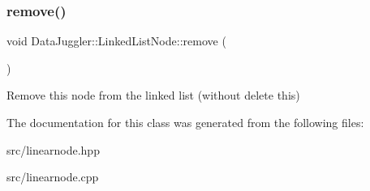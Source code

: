 \subsubsection{\texorpdfstring{remove()}{remove()}}
{\footnotesize\ttfamily void Data\+Juggler\+::\+Linked\+List\+Node\+::remove (\begin{DoxyParamCaption}{ }\end{DoxyParamCaption})}

Remove this node from the linked list (without delete this) 

The documentation for this class was generated from the following files\+:\begin{DoxyCompactItemize}
\item 
src/linearnode.\+hpp\item 
src/linearnode.\+cpp\end{DoxyCompactItemize}
